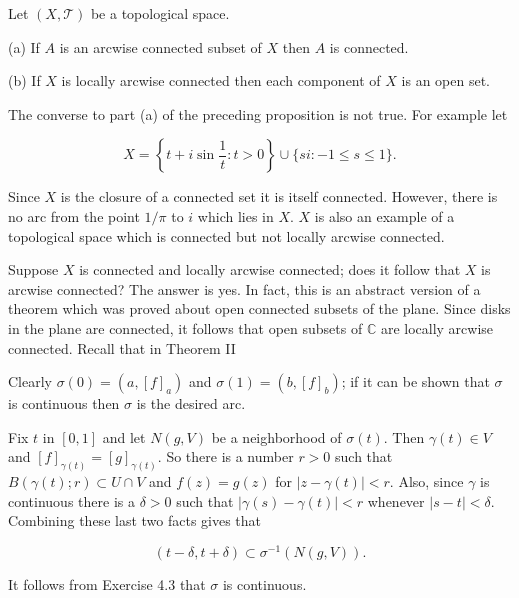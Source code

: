 Let $(X, \mathcal{T})$ be a topological space.

(a) If $A$ is an arcwise connected subset of $X$ then $A$ is connected.

(b) If $X$ is locally arcwise connected then each component of $X$ is an open set.

The converse to part (a) of the preceding proposition is not true. For example let

$$X = \left\{ t + i \sin \frac{1}{t} : t > 0 \right\} \cup \{si : -1 \leq s \leq 1\}.$$

Since $X$ is the closure of a connected set it is itself connected. However, there is no arc from the point $1/\pi$ to $i$ which lies in $X$. $X$ is also an example of a topological space which is connected but not locally arcwise connected.

Suppose $X$ is connected and locally arcwise connected; does it follow that $X$ is arcwise connected? The answer is yes. In fact, this is an abstract version of a theorem which was proved about open connected subsets of the plane. Since disks in the plane are connected, it follows that open subsets of $\mathbb{C}$ are locally arcwise connected. Recall that in Theorem II

Clearly $\sigma(0) = (a, [f]_a)$ and $\sigma(1) = (b, [f]_b)$; if it can be shown that $\sigma$ is continuous then $\sigma$ is the desired arc.

Fix $t$ in $[0, 1]$ and let $N(g, V)$ be a neighborhood of $\sigma(t)$. Then $\gamma(t) \in V$ and $[f]_{\gamma(t)} = [g]_{\gamma(t)}$. So there is a number $r > 0$ such that $B(\gamma(t); r) \subset U \cap V$ and $f(z) = g(z)$ for $|z - \gamma(t)| < r$. Also, since $\gamma$ is continuous there is a $\delta > 0$ such that $|\gamma(s) - \gamma(t)| < r$ whenever $|s - t| < \delta$. Combining these last two facts gives that

$$(t - \delta, t + \delta) \subset \sigma^{-1}(N(g, V)).$$

It follows from Exercise 4.3 that $\sigma$ is continuous.